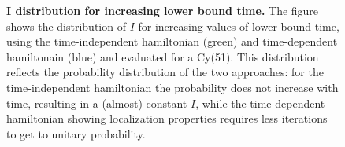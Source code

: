 
\begin{figure}[ht]
  \centering
  \caption[$I$ distribution for increasing lower bound time.]{\textbf{$\bm{I}$ distribution for increasing lower bound time. }The figure shows the distribution of $I$ for increasing values of lower bound time, using the time-independent hamiltonian (green) and time-dependent hamiltonain (blue) and evaluated for a Cy(51). This distribution reflects the probability distribution of the two approaches: for the time-independent hamiltonian the probability does not increase with time, resulting in a (almost) constant $I$, while the time-dependent hamiltonian showing localization properties requires less iterations to get to unitary probability.}
  \label{fig:iters_increasing_time}
\end{figure}
